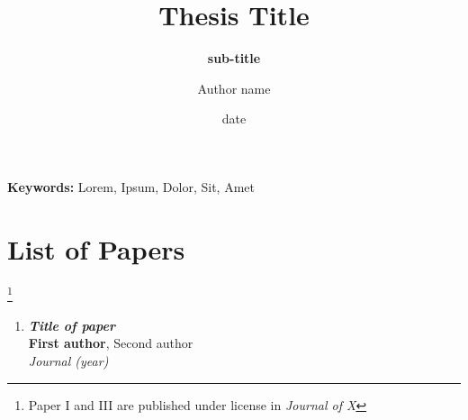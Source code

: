 \documentclass[electronic]{kthesis}
\begin{document}
	
	\title{ Thesis Title }
	\subtitle{\textbf{sub-title}}
	\author{Author name}
	\date{date}
	\address{KTH Royal Institute of Technology \\School of Electrical Engineering and Computer Science\\ Division of Fusion Plasma Physics \\ SE-10044 Stockholm\\ Sweden}
	
	\maketitle
	
	\frontmatter %
	\begin{abstract}
		\noindent \lipsum[1]
		
	\end{abstract}
	
	\bigskip \bigskip \bigskip \bigskip \bigskip
	
	\setlength{\leftskip}{0.3 cm} \textbf {Keywords:} Lorem, Ipsum, Dolor, Sit, Amet
	
	\newpage
	\begin{abstract}
		\noindent \lipsum[1]
	\end{abstract}
	
	\chapter{List of Papers}
	
	\let\thefootnote\relax\footnote{Paper I and III are published under license in \textit{Journal of X}}
	\begin{enumerate}[I]
		\item \textbf{\textit{Title of paper}} \\
		\textbf{First author}, Second author \\
		\textit{Journal (year)}
	\end{enumerate}
	
\end{document}
